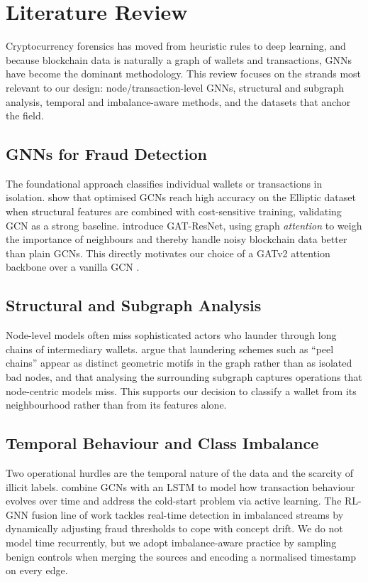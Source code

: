 \documentclass[12pt,a4paper,openany]{report}
\begin{document}
\chapter{Literature Review}\label{ch:lit}
Cryptocurrency forensics has moved from heuristic rules to deep learning, and because
blockchain data is naturally a graph of wallets and transactions, GNNs have become the
dominant methodology. This review focuses on the strands most relevant to our design:
node/transaction-level GNNs, structural and subgraph analysis, temporal and imbalance-aware
methods, and the datasets that anchor the field.

\section{GNNs for Fraud Detection}
The foundational approach classifies individual wallets or transactions in isolation.
\citet{asiri2025gcn} show that optimised GCNs reach high accuracy on the Elliptic dataset when
structural features are combined with cost-sensitive training, validating GCN as a strong
baseline. \citet{zhang2024gatresnet} introduce GAT-ResNet, using graph \emph{attention} to
weigh the importance of neighbours and thereby handle noisy blockchain data better than plain
GCNs. This directly motivates our choice of a GATv2 attention backbone
\citep{brody2022gatv2,velickovic2018gat} over a vanilla GCN \citep{kipf2017gcn}.

\section{Structural and Subgraph Analysis}
Node-level models often miss sophisticated actors who launder through long chains of
intermediary wallets. \citet{ouyang2024subgraph} argue that laundering schemes such as
``peel chains'' appear as distinct geometric motifs in the graph rather than as isolated bad
nodes, and that analysing the surrounding subgraph captures operations that node-centric
models miss. This supports our decision to classify a wallet from its neighbourhood rather than
from its features alone.

\section{Temporal Behaviour and Class Imbalance}
Two operational hurdles are the temporal nature of the data and the scarcity of illicit labels.
\citet{alarab2022lstm} combine GCNs with an LSTM to model how transaction behaviour evolves
over time and address the cold-start problem via active learning. The RL-GNN fusion line of
work \citep{rlgnn2025} tackles real-time detection in imbalanced streams by dynamically
adjusting fraud thresholds to cope with concept drift. We do not model time recurrently, but we
adopt imbalance-aware practice by sampling benign controls when merging the sources and encoding a
normalised timestamp on every edge.
\end{document}
